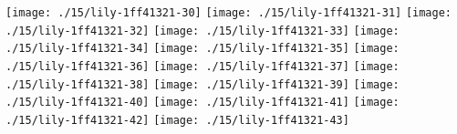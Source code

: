 \else
  \expandafter{}%
\fi
\texttt{[image: ./15/lily-1ff41321-30]}%
\ifx\betweenLilyPondSystem \undefined
  \linebreak
\else
  \expandafter{}%
\fi
\texttt{[image: ./15/lily-1ff41321-31]}%
\ifx\betweenLilyPondSystem \undefined
  \linebreak
\else
  \expandafter{}%
\fi
\texttt{[image: ./15/lily-1ff41321-32]}%
\ifx\betweenLilyPondSystem \undefined
  \linebreak
\else
  \expandafter{}%
\fi
\texttt{[image: ./15/lily-1ff41321-33]}%
\ifx\betweenLilyPondSystem \undefined
  \linebreak
\else
  \expandafter{}%
\fi
\texttt{[image: ./15/lily-1ff41321-34]}%
\ifx\betweenLilyPondSystem \undefined
  \linebreak
\else
  \expandafter{}%
\fi
\texttt{[image: ./15/lily-1ff41321-35]}%
\ifx\betweenLilyPondSystem \undefined
  \linebreak
\else
  \expandafter{}%
\fi
\texttt{[image: ./15/lily-1ff41321-36]}%
\ifx\betweenLilyPondSystem \undefined
  \linebreak
\else
  \expandafter{}%
\fi
\texttt{[image: ./15/lily-1ff41321-37]}%
\ifx\betweenLilyPondSystem \undefined
  \linebreak
\else
  \expandafter{}%
\fi
\texttt{[image: ./15/lily-1ff41321-38]}%
\ifx\betweenLilyPondSystem \undefined
  \linebreak
\else
  \expandafter{}%
\fi
\texttt{[image: ./15/lily-1ff41321-39]}%
\ifx\betweenLilyPondSystem \undefined
  \linebreak
\else
  \expandafter{}%
\fi
\texttt{[image: ./15/lily-1ff41321-40]}%
\ifx\betweenLilyPondSystem \undefined
  \linebreak
\else
  \expandafter{}%
\fi
\texttt{[image: ./15/lily-1ff41321-41]}%
\ifx\betweenLilyPondSystem \undefined
  \linebreak
\else
  \expandafter{}%
\fi
\texttt{[image: ./15/lily-1ff41321-42]}%
\ifx\betweenLilyPondSystem \undefined
  \linebreak
\else
  \expandafter{}%
\fi
\texttt{[image: ./15/lily-1ff41321-43]}%
\ifx\betweenLilyPondSystem \undefined
  \linebreak
\else
  \expandafter{}%
